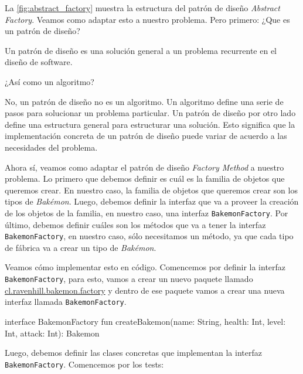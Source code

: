   La \cref{fig:abstract_factory} muestra la estructura del patrón de diseño \textit{Abstract 
  Factory}.
  Veamos como adaptar esto a nuestro problema.
  Pero primero: ¿Que es un patrón de diseño?

  \begin{defaultbox}
    Un patrón de diseño es una solución general a un problema recurrente en el diseño de software.    
  \end{defaultbox}

  \begin{center}
    ¿Así como un algoritmo?
  \end{center}

  No, un patrón de diseño no es un algoritmo.
  Un algoritmo define una serie de pasos para solucionar un problema particular.
  Un patrón de diseño por otro lado define una estructura general para estructurar una solución.
  Esto significa que la implementación concreta de un patrón de diseño puede variar de acuerdo a
  las necesidades del problema.
  
  Ahora sí, veamos como adaptar el patrón de diseño \textit{Factory Method} a nuestro problema.
  Lo primero que debemos definir es cuál es la familia de objetos que queremos crear.
  En nuestro caso, la familia de objetos que queremos crear son los tipos de \textit{Bakémon}.
  Luego, debemos definir la interfaz que va a proveer la creación de los objetos de la familia, en
  nuestro caso, una interfaz \texttt{BakemonFactory}.
  Por último, debemos definir cuáles son los métodos que va a tener la interfaz 
  \texttt{BakemonFactory}, en nuestro caso, sólo necesitamos un método, ya que cada tipo de
  fábrica va a crear un tipo de \textit{Bakémon}.

  Veamos cómo implementar esto en código.
  Comencemos por definir la interfaz \texttt{BakemonFactory}, para esto, vamos a crear un nuevo
  paquete llamado \url{cl.ravenhill.bakemon.factory} y dentro de ese paquete vamos a crear una nueva
  interfaz llamada \texttt{BakemonFactory}.  

  \begin{kotlin}
    interface BakemonFactory {
      fun createBakemon(name: String, health: Int, level: Int, attack: Int): Bakemon
    }
  \end{kotlin}

  Luego, debemos definir las clases concretas que implementan la interfaz \texttt{BakemonFactory}.
  Comencemos por los tests:

